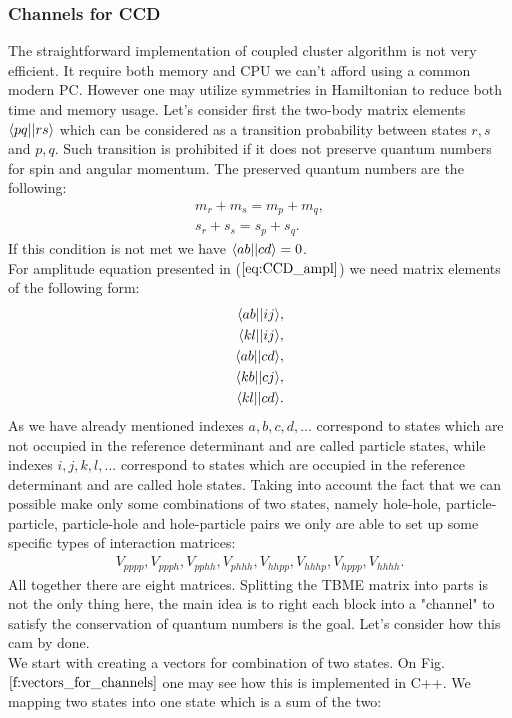 \documentclass[twoside,english]{uiofysmaster}
\theoremstyle{definition}
\begin{document}
\subsubsection{Channels for CCD}
The straightforward implementation of coupled cluster algorithm is not very efficient. It require both memory and CPU we can't afford using a common modern PC. However one may utilize symmetries in Hamiltonian to reduce both time and memory usage. Let's consider first the two-body matrix elements $\braket{pq||rs}$ which can be considered as a transition probability between states $r,s$ and $p,q$. Such transition is prohibited if it does not preserve quantum numbers for spin and angular momentum. The preserved quantum numbers are the following:
\begin{align}
m_r + m_s = m_p + m_q,\\
s_r + s_s = s_p + s_q.
\end{align}
If this condition is not met we have $\braket{ab||cd} = 0$.\\
For amplitude equation presented in ($\ref{eq:CCD_ampl}$) we need matrix elements of the following form:
\begin{align}\label{eq:TBME_channels}
\braket{ab||ij}&,\\
\braket{kl||ij}&,\\
\braket{ab||cd}&,\\
\braket{kb||cj}&,\\
\braket{kl||cd}&.\\
\end{align}
As we have already mentioned indexes $a,b,c,d,...$ correspond to states which are not occupied in the reference determinant and are called particle states, while  indexes $i,j,k,l,...$ correspond to states which are occupied in the reference determinant and are called hole states. Taking into account the fact that we can possible make only some combinations of two states, namely hole-hole, particle-particle, particle-hole and hole-particle pairs we only are able to set up some  specific types of interaction matrices:
\begin{align}
V_{pppp},V_{ppph}, V_{pphh}, V_{phhh},V_{hhpp},V_{hhhp},V_{hppp},V_{hhhh}.
\end{align}
All together there are eight matrices. Splitting the TBME matrix into parts is not the only thing here, the main idea is to right each block into a "channel" to satisfy the conservation of quantum numbers is the goal. Let's consider how this cam by done.\\
We start with creating a vectors for combination of two states. On Fig. $\ref{f:vectors_for_channels}$ one may see how this is implemented in C++. We mapping two states into one state which is a sum of the two:
\end{document}
